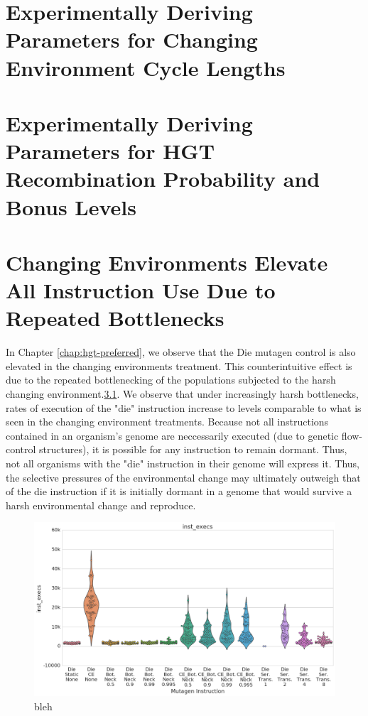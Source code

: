 \documentclass[PhD]{msu-thesis}
\begin{document}
\begin{appendices}
\chapter{Experimentally Deriving Parameters for Changing Environment Cycle Lengths}
\label{appendix:ce_sweep}

\chapter{Experimentally Deriving Parameters for HGT Recombination Probability and Bonus Levels}
\label{appendix:hgt_sweep}

\chapter{Changing Environments Elevate All Instruction Use Due to Repeated Bottlenecks}
In Chapter \ref{chap:hgt-preferred}, we observe that the Die mutagen control is also elevated in the changing environments treatment. This counterintuitive effect is due to the repeated bottlenecking of the populations subjected to the harsh changing environment.\ref{fig:bottlenecks}. We observe that under increasingly harsh bottlenecks, rates of execution of the "die" instruction increase to levels comparable to what is seen in the changing environment treatments. Because not all instructions contained in an organism's genome are neccessarily executed (due to genetic flow-control structures), it is possible for any instruction to remain dormant. Thus, not all organisms with the "die" instruction in their genome will express it. Thus, the selective pressures of the environmental change may ultimately outweigh that of the die instruction if it is initially dormant in a genome that would survive a harsh environmental change and reproduce. 

\begin{figure}[h!]
\begin{center}
\includegraphics[width=0.7\columnwidth]{figures/HGT/die_bottleneck.png}
\caption{bleh
}\label{fig:bottlenecks}
\end{center}
\end{figure}

\end{appendices}


\backmatter
\makebibliographypage
\SingleSpacing


\end{document}
